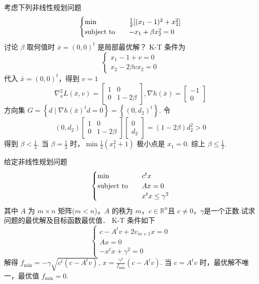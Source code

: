 \begin{problem}[P243 9]
    考虑下列非线性规划问题
    \[\begin{cases}
        \min \quad &\frac{1}{2}[(x_1 - 1)^2 + x_2^2]\\
        \operatorname{subject\ to} \quad &-x_1 + \beta x_2^2 = 0
    \end{cases}\]
    讨论 $\beta$ 取何值时 $\bar{x} = (0, 0)^t$ 是局部最优解？
    \Answer K-T 条件为 \[\begin{cases}
        x_1 - 1 + v = 0\\
        x_2 - 2\beta vx_2 = 0
    \end{cases}\]
    代入 $\bar{x} = (0, 0)^t$，得到 $v = 1$\[\nabla^2_xL(\bar{x}, v) = \begin{bmatrix}
        1 & 0 \\ 0 & 1 - 2\beta
    \end{bmatrix}, \nabla h(\bar{x}) = \begin{bmatrix}
        -1 \\ 0
    \end{bmatrix}\] 方向集 $G = \left\{d \mid \nabla h(\bar{x})^td = 0\right\} = \left\{(0, d_2)^t\right\}$. 令 \[(0, d_2)\begin{bmatrix}
        1 & 0 \\ 0 & 1 - 2\beta
    \end{bmatrix}\begin{bmatrix}
        0 \\ d_2
    \end{bmatrix} = (1 - 2\beta)d_2^2 > 0\]得到 $\beta < \frac{1}{2}$. 当 $\beta = \frac{1}{2}$ 时，$\min \frac{1}{2}(x_1^2 + 1)$ 极小点是 $x_1 = 0$. 综上 $\beta \le \frac{1}{2}$.
\end{problem}

\begin{problem}[P243 10]
    给定非线性规划问题
    \[\begin{cases}
        \min \quad &c^tx\\
        \operatorname{subject\ to} \quad &Ax = 0\\
        &x^tx\le \gamma^2
    \end{cases}\]
    其中 $A$ 为 $m \times n$ 矩阵($m < n$)，$A$ 的秩为 $m$，$c\in \mathbb{R}^n$且 $c \neq 0$，$\gamma$是一个正数.试求问题的最优解及目标函数最优值．
    \Answer K-T 条件如下\[\begin{cases}
        c - A^tv + 2v_{m + 1}x = 0\\
        Ax = 0\\
        -x^tx + \gamma^2 = 0
    \end{cases}\] 解得 $f_{\min} = -\gamma \sqrt{c^t(c - A^tv)}$, $x = \frac{\gamma^2}{f_{\min}}(c - A^tv)$. 当 $c = A^tv$ 时，最优解不唯一，最优值 $f_{\min} = 0$.
\end{problem}


